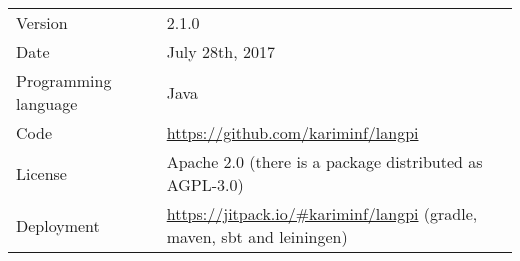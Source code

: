 \begin{tabular}{p{}p{}p{}} 
\hline \hline
Version && 2.1.0 \\
Date && July 28th, 2017\\
Programming language && Java \\
Code && \url{https://github.com/kariminf/langpi} \\
License && Apache 2.0 (there is a package distributed as AGPL-3.0) \\
Deployment && \url{https://jitpack.io/#kariminf/langpi} (gradle, maven, sbt and leiningen)\\

\hline \hline
\end{tabular}
